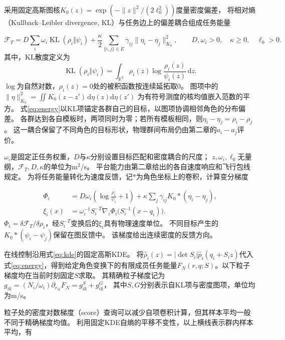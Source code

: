 \documentclass[UTF8,a4paper,11pt,fontset=none]{ctexart}
\newcommand{\R}{\mathbb R}\newcommand{\KL}{\operatorname{KL}}
\begin{document}
采用固定高斯图核$K_0(z)=\exp(-\|z\|^2/(2\ell_0^2))$度量密度偏差，
将相对熵（Kullback--Leibler divergence, KL）与任务边上的偏差耦合组成任务能量

\begin{equation}
\mathcal F_T=D\sum_i\omega_i\KL(\rho_i\Vert\psi_i)
+\frac\kappa2\sum_{\{i,j\}\in E}\gamma_{ij}\|\eta_i-\eta_j\|_{K_0}^2,
\qquad D,\omega_i>0,\quad\kappa\ge0,\quad\ell_0>0.
\label{eq:energy}
\end{equation}
其中，KL散度定义为
\[
\KL(\rho_i\Vert\psi_i)
=\int_{\R^3}\rho_i(z)\log\frac{\rho_i(z)}{\psi_i(z)}\,\mathrm dz .
\]
$\log$为自然对数，$\rho_i(z)=0$处的被积函数按连续延拓取0。
图项中的$\|\eta\|_{K_0}^2=\iint K_0(z-z')\,\mathrm d\eta(z)\mathrm d\eta(z')$
为有符号测度的核均值嵌入范数的平方。
式\eqref{eq:energy}以KL项锚定各群自己的目标，以图项协调相邻角色的分布偏差。
各群达到各自模板时，两项同时为零；若所有模板相同，则$\eta_i-\eta_j=\rho_i-\rho_j$。
这一耦合保留了不同角色的目标形状，物理群间布局仍由第二章的$a_i-a_j$评价。

$\omega_i$是固定正任务权重，$D$与$\kappa$分别设置目标匹配和密度耦合的尺度；
$z,\omega_i,\ell_0$无量纲，$\mathcal F_T,D,\kappa$的单位为m$^2$/s。
平台能力由第二章给出的各自速度响应和飞行包线规定。
为将任务能量转化为速度反馈，记$*$为角色坐标上的卷积，计算变分梯度

\begin{equation}
\begin{aligned}
\Phi_i&=D\omega_i\left(\log\frac{\rho_i}{\psi_i}+1\right)
+\kappa\sum_j\gamma_{ij}K_0*(\eta_i-\eta_j),\\
\xi_i(x)&=\omega_i^{-1}S_i^{-T}\nabla_z\Phi_i\big(S_i^{-1}(x-q_i)\big).
\end{aligned}
\label{eq:variational-gradient}
\end{equation}
$\Phi_i=\delta\mathcal F_T/\delta\rho_i$，经$S_i^{-T}$变换后的$\xi_i$具有物理速度单位。
不同目标产生的$K_0*(\psi_i-\psi_j)$保留在图反馈中。
该梯度给出连续密度的反馈方向。

在线控制沿用式\eqref{eq:kde}的固定高斯KDE。
将$\widehat\rho_i(z)=|\det S_i|\widehat p_i(q_i+S_i z)$代入式\eqref{eq:energy}，得到给定角色变换下的有限成员任务能量$F_N(r,q;S)$。以下粒子梯度均在当前时刻固定$S$求取。
其精确粒子梯度记为
$g_{ik}=(N_i/\omega_i)\partial_{r_{ik}}F_N=g^S_{ik}+g^G_{ik}$，
其中$S,G$分别表示自KL项与密度图项，单位均为m/s。

粒子处的密度对数梯度（score）查询可以减少自项卷积计算，但其样本平均一般不同于精确梯度均值。
利用固定KDE自熵的平移不变性，以上横线表示群内样本平均，有
\end{document}
